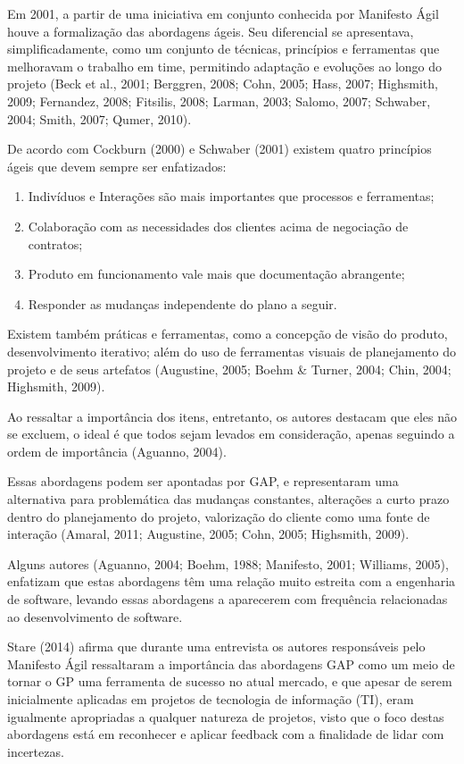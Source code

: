 Em 2001, a partir de uma iniciativa em conjunto conhecida por Manifesto Ágil houve a formalização das abordagens ágeis. Seu diferencial se apresentava, simplificadamente, como um conjunto de técnicas, princípios e ferramentas que melhoravam o trabalho em time, permitindo adaptação e evoluções ao longo do projeto (Beck et al., 2001; Berggren, 2008; Cohn, 2005; Hass, 2007; Highsmith, 2009; Fernandez, 2008; Fitsilis, 2008; Larman, 2003; Salomo, 2007; Schwaber, 2004; Smith, 2007; Qumer, 2010).

De acordo com Cockburn (2000) e Schwaber (2001) existem quatro princípios ágeis que devem sempre ser enfatizados:

\begin{enumerate}
    \item{Indivíduos e Interações são mais importantes que processos e ferramentas;}
    \item{Colaboração com as necessidades dos clientes acima de negociação de contratos;}
    \item{Produto em funcionamento vale mais que documentação abrangente;}
    \item{Responder as mudanças independente do plano a seguir.}
\end{enumerate}

Existem também práticas e ferramentas, como a concepção de visão do produto, desenvolvimento iterativo; além do uso de ferramentas visuais de planejamento do projeto e de seus artefatos (Augustine, 2005; Boehm \& Turner, 2004; Chin, 2004; Highsmith, 2009).

Ao ressaltar a importância dos itens, entretanto, os autores destacam que eles não se excluem, o ideal é que todos sejam levados em consideração, apenas seguindo a ordem de importância (Aguanno, 2004).

Essas abordagens podem ser apontadas por GAP, e representaram uma alternativa para problemática das mudanças constantes, alterações a curto prazo dentro do planejamento do projeto, valorização do cliente como uma fonte de interação (Amaral, 2011; Augustine, 2005; Cohn, 2005; Highsmith, 2009).

Alguns autores (Aguanno, 2004; Boehm, 1988; Manifesto, 2001; Williams, 2005), enfatizam que estas abordagens têm uma relação muito estreita com a engenharia de software, levando essas abordagens a aparecerem com frequência relacionadas ao desenvolvimento de software.

Stare (2014) afirma que durante uma entrevista os autores responsáveis pelo Manifesto Ágil ressaltaram a importância das abordagens GAP como um meio de tornar o GP uma ferramenta de sucesso no atual mercado, e que apesar de serem inicialmente aplicadas em projetos de tecnologia de informação (TI), eram igualmente apropriadas a qualquer natureza de projetos, visto que o foco destas abordagens está em reconhecer e aplicar feedback com a finalidade de lidar com incertezas.

